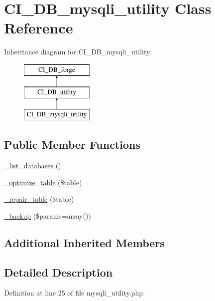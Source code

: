 \hypertarget{class_c_i___d_b__mysqli__utility}{\section{C\-I\-\_\-\-D\-B\-\_\-mysqli\-\_\-utility Class Reference}
\label{class_c_i___d_b__mysqli__utility}
}
Inheritance diagram for C\-I\-\_\-\-D\-B\-\_\-mysqli\-\_\-utility\-:\begin{figure}[H]
\begin{center}
\leavevmode
\includegraphics[height=3.000000cm]{class_c_i___d_b__mysqli__utility}
\end{center}
\end{figure}
\subsection*{Public Member Functions}
\begin{DoxyCompactItemize}
\item 
\hyperlink{class_c_i___d_b__mysqli__utility_aa047e69a7e732ca7280270f87f82bb3a}{\-\_\-list\-\_\-databases} ()
\item 
\hyperlink{class_c_i___d_b__mysqli__utility_a4856292816fbbc8e9d927f565766727b}{\-\_\-optimize\-\_\-table} (\$table)
\item 
\hyperlink{class_c_i___d_b__mysqli__utility_a7f40d4a3d78917e455e315cf708842ef}{\-\_\-repair\-\_\-table} (\$table)
\item 
\hyperlink{class_c_i___d_b__mysqli__utility_a30f3053d2c82e7562349924363507afa}{\-\_\-backup} (\$params=array())
\end{DoxyCompactItemize}
\subsection*{Additional Inherited Members}


\subsection{Detailed Description}


Definition at line 25 of file mysqli\-\_\-utility.\-php.



